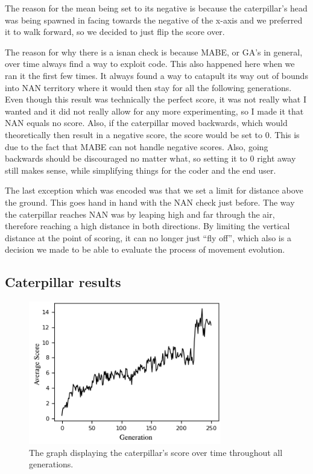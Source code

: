 \documentclass[12pt,oneside,listof=totoc,paper=a4,headings=small]{scrbook}
\begin{document}
The reason for the mean being set to its negative is because the caterpillar's head was being spawned in facing towards the negative of the x-axis and we preferred it to walk forward, so we decided to just flip the score over. 

The reason for why there is a isnan check is because MABE, or GA's in general, over time always find a way to exploit code. This also happened here when we ran it the first few times. It always found a way to catapult its way out of bounds into NAN territory where it would then stay for all the following generations. Even though this result was technically the perfect score, it was not really what I wanted and it did not really allow for any more experimenting, so I made it that NAN equals no score.
\newpage
Also, if the caterpillar moved backwards, which would theoretically then result in a negative score, the score would be set to 0. This is due to the fact that MABE can not handle negative scores. Also, going backwards should be discouraged no matter what, so setting it to 0 right away still makes sense, while simplifying things for the coder and the end user.

The last exception which was encoded was that we set a limit for distance above the ground. This goes hand in hand with the NAN check just before. The way the caterpillar reaches NAN was by leaping high and far through the air, therefore reaching a high distance in both directions. By limiting the vertical distance at the point of scoring, it can no longer just ``fly off'', which also is a decision we made to be able to evaluate the process of movement evolution.
\subsection{Caterpillar results}

\begin{figure}[h!]
\centering
\includegraphics[width=0.75\textwidth,height=0.75\textheight,keepaspectratio]{images/Score_Caterpillar.png}
\caption{The graph displaying the caterpillar's score over time throughout all generations.}
\label{fig:scorecaterpillar}
\end{figure}
\end{document}
